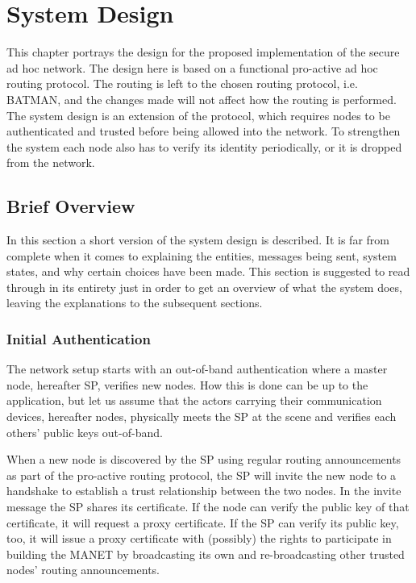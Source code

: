 \chapter{System Design}
\label{ch:design}
\acresetall

This chapter portrays the design for the proposed implementation of the secure
ad hoc network. The design here is based on a functional pro-active ad hoc
routing protocol. The routing is left to the chosen routing protocol, i.e.
\ac{BATMAN}, and the changes made will not affect how the routing is performed.
The system design is an extension of the protocol, which requires nodes to be
authenticated and trusted before being allowed into the network. To strengthen
the system each node also has to verify its identity periodically, or it is
dropped from the network.

\section{Brief Overview}
In this section a short version of the system design is described. It is far
from complete when it comes to explaining the entities, messages being sent,
system states, and why certain choices have been made. This section is
suggested to read through in its entirety just in order to get an overview of
what the system does, leaving the explanations to the subsequent sections.

\subsection{Initial Authentication}
The network setup starts with an out-of-band authentication where a master node,
hereafter \ac{SP}, verifies new nodes. How this is done can be up to the
application, but let us assume that the actors carrying their communication
devices, hereafter nodes, physically meets the \ac{SP} at the scene and verifies
each others' public keys out-of-band.

When a new node is discovered by the \ac{SP} using regular routing announcements
as part of the pro-active routing protocol, the \ac{SP} will invite the new node
to a handshake to establish a trust relationship between the two nodes. In the
invite message the \ac{SP} shares its certificate. If the node can verify the
public key of that certificate, it will request a proxy certificate. If the
\ac{SP} can verify its public key, too, it will issue a proxy certificate with
(possibly) the rights to participate in building the \ac{MANET} by broadcasting
its own and re-broadcasting other trusted nodes' routing announcements.

